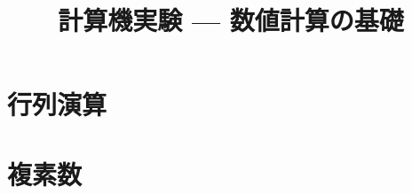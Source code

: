 \documentclass[10pt,dvipdfmx]{beamer}
\title{計算機実験 --- 数値計算の基礎}
\begin{document}
\begin{frame}
  \titlepage
  \tableofcontents
\end{frame}




\section{行列演算}

\section{複素数}




\end{document}

